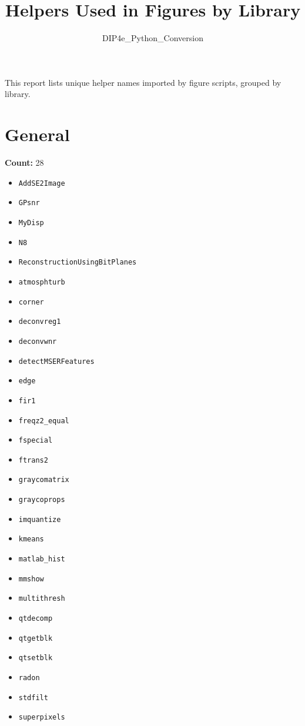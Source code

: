 \documentclass[11pt]{article}
\title{Helpers Used in Figures by Library}
\author{DIP4e\_Python\_Conversion}
\date{}
\begin{document}
\maketitle
This report lists unique helper names imported by figure scripts, grouped by library.
\section*{General}
\textbf{Count:} 28
\begin{itemize}[leftmargin=1.5em]
\item \texttt{AddSE2Image}
\item \texttt{GPsnr}
\item \texttt{MyDisp}
\item \texttt{N8}
\item \texttt{ReconstructionUsingBitPlanes}
\item \texttt{atmosphturb}
\item \texttt{corner}
\item \texttt{deconvreg1}
\item \texttt{deconvwnr}
\item \texttt{detectMSERFeatures}
\item \texttt{edge}
\item \texttt{fir1}
\item \texttt{freqz2\_equal}
\item \texttt{fspecial}
\item \texttt{ftrans2}
\item \texttt{graycomatrix}
\item \texttt{graycoprops}
\item \texttt{imquantize}
\item \texttt{kmeans}
\item \texttt{matlab\_hist}
\item \texttt{mmshow}
\item \texttt{multithresh}
\item \texttt{qtdecomp}
\item \texttt{qtgetblk}
\item \texttt{qtsetblk}
\item \texttt{radon}
\item \texttt{stdfilt}
\item \texttt{superpixels}
\end{itemize}
\end{document}

